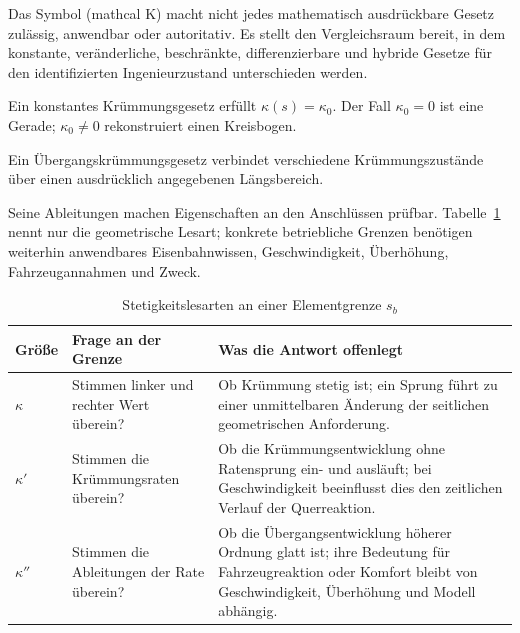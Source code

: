 Das Symbol (mathcal K) macht nicht jedes mathematisch ausdrückbare Gesetz
zulässig, anwendbar oder autoritativ. Es stellt den Vergleichsraum bereit, in
dem konstante, veränderliche, beschränkte, differenzierbare und hybride Gesetze
für den identifizierten Ingenieurzustand unterschieden werden.

\begin{definition}
\label{def:constant-curvature}
Ein konstantes Krümmungsgesetz erfüllt $\kappa(s)=\kappa_0$. Der Fall
$\kappa_0=0$ ist eine Gerade; $\kappa_0\neq0$ rekonstruiert einen
Kreisbogen.
\end{definition}

\begin{definition}[Übergangskrümmung]
\label{def:transition-curvature}
Ein Übergangskrümmungsgesetz verbindet verschiedene Krümmungszustände über
einen ausdrücklich angegebenen Längsbereich.
\end{definition}

Seine Ableitungen machen Eigenschaften an den Anschlüssen prüfbar.
Tabelle~\ref{tab:curvature-continuity-reading} nennt nur die geometrische
Lesart; konkrete betriebliche Grenzen benötigen weiterhin anwendbares
Eisenbahnwissen, Geschwindigkeit, Überhöhung, Fahrzeugannahmen und Zweck.

\begin{table}[htbp]
\centering
\small
\caption{Stetigkeitslesarten an einer Elementgrenze $s_b$}
\label{tab:curvature-continuity-reading}
\begin{tabular}{@{}p{}p{}p{}@{}}
\toprule
Größe & Frage an der Grenze & Was die Antwort offenlegt \\
\midrule
$\kappa$ & Stimmen linker und rechter Wert überein? & Ob Krümmung stetig ist; ein Sprung führt zu einer unmittelbaren Änderung der seitlichen geometrischen Anforderung. \\
$\kappa'$ & Stimmen die Krümmungsraten überein? & Ob die Krümmungsentwicklung ohne Ratensprung ein- und ausläuft; bei Geschwindigkeit beeinflusst dies den zeitlichen Verlauf der Querreaktion. \\
$\kappa''$ & Stimmen die Ableitungen der Rate überein? & Ob die Übergangsentwicklung höherer Ordnung glatt ist; ihre Bedeutung für Fahrzeugreaktion oder Komfort bleibt von Geschwindigkeit, Überhöhung und Modell abhängig. \\
\bottomrule
\end{tabular}
\end{table}

